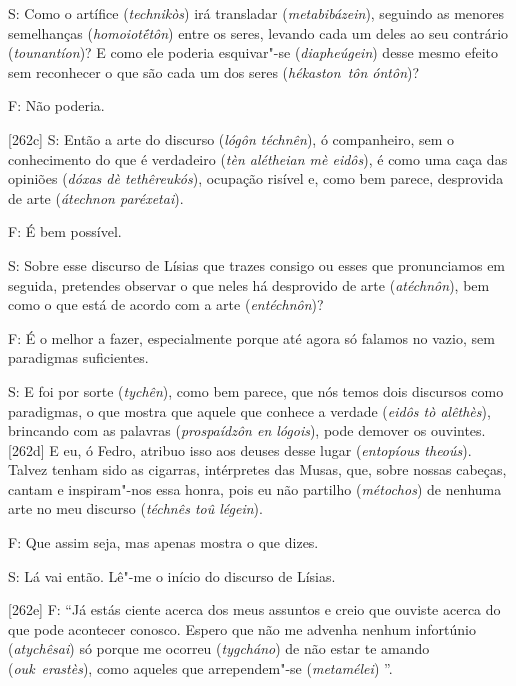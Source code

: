  

S: Como o artífice (\emph{technikòs}) irá transladar
(\emph{metabibázein}), seguindo as menores semelhanças
(\emph{homoiotḗtôn}) entre os seres, levando cada um deles ao seu
contrário (\emph{tounantíon})? E como ele poderia esquivar"-se
(\emph{diapheúgein}) desse mesmo efeito sem reconhecer o que são cada um
dos seres (\emph{hékaston}~\emph{tôn óntôn})?

 

F: Não poderia.

 

[262c] S: Então a arte do discurso (\emph{lógôn téchnên}), ó
companheiro, sem o conhecimento do que é verdadeiro (\emph{tèn alétheian
mè eidôs}), é como uma caça das opiniões (\emph{dóxas dè tethêreukós}),
ocupação risível e, como bem parece, desprovida de arte (\emph{átechnon
paréxetai}).

 

F: É bem possível.

 

S: Sobre esse discurso de Lísias que trazes consigo ou esses que
pronunciamos em seguida, pretendes observar o que neles há desprovido de
arte (\emph{atéchnôn}), bem como o que está de acordo com a arte
(\emph{entéchnôn})?

 

F: É o melhor a fazer, especialmente porque até agora só falamos no
vazio, sem paradigmas suficientes.

 

S: E foi por sorte (\emph{tychên}), como bem parece, que nós temos dois
discursos como paradigmas, o que mostra que aquele que conhece a verdade
(\emph{eidôs tò alêthès}), brincando com as palavras (\emph{prospaídzôn
en lógois}), pode demover os ouvintes. [262d] E eu, ó Fedro, atribuo
isso aos deuses desse lugar (\emph{entopíous theoús}). Talvez tenham
sido as cigarras, intérpretes das Musas, que, sobre nossas cabeças,
cantam e inspiram"-nos essa honra, pois eu não partilho (\emph{métochos})
de nenhuma arte no meu discurso (\emph{téchnês toû légein}).

 

F: Que assim seja, mas apenas mostra o que dizes.

 

S: Lá vai então. Lê"-me o início do discurso de Lísias.

 

[262e] F: ``Já estás ciente acerca dos meus assuntos e creio que
ouviste acerca do que pode acontecer conosco. Espero que não me advenha
nenhum infortúnio (\emph{atychêsai}) só porque me ocorreu
(\emph{tygcháno}) de não estar te amando (\emph{ouk}~\emph{erastès}),
como aqueles que \redondo{[…]} arrependem"-se (\emph{metamélei})
\redondo{[…]}''.

